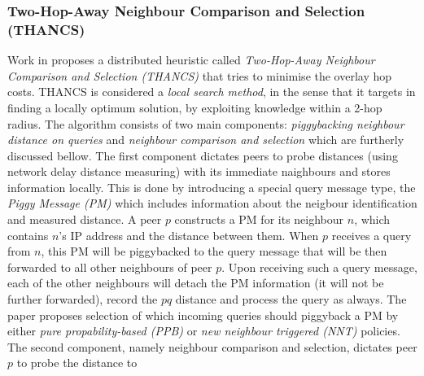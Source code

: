 %
%
%

\subsubsection{Two-Hop-Away Neighbour Comparison and Selection (THANCS)}
Work in \cite{liu_thancs_2005,liu_thancs_2008} proposes a distributed heuristic
called \emph{Two-Hop-Away Neighbour Comparison and Selection (THANCS)} that
tries to minimise the overlay hop costs. THANCS is considered a \emph{local
search method}, in the sense that it targets in finding a locally optimum
solution, by exploiting knowledge within a 2-hop radius. The algorithm consists
of two main components: \emph{piggybacking neighbour distance on queries} and
\emph{neighbour comparison and selection} which are furtherly discussed bellow.
The first component dictates peers to probe distances (using network delay
distance measuring) with its immediate naighbours and stores information
locally. This is done by introducing a special query message type, the
\emph{Piggy Message (PM)} which includes information about the neigbour
identification and measured distance. A peer $p$ constructs a PM for its
neighbour $n$, which contains $n$'s IP address and the distance between them.
When $p$ receives a query from $n$, this PM will be piggybacked to the query
message that will be then forwarded to all other neighbours of peer $p$. Upon
receiving such a query message, each of the other neighbours will detach the PM
information (it will not be further forwarded), record the $pq$ distance and
process the query as always. The paper proposes selection of which incoming
queries should piggyback a PM by either \emph{pure propability-based (PPB)} or
\emph{new neighbour triggered (NNT)} policies. The second component, namely
neighbour comparison and selection, dictates peer $p$ to probe the distance to
